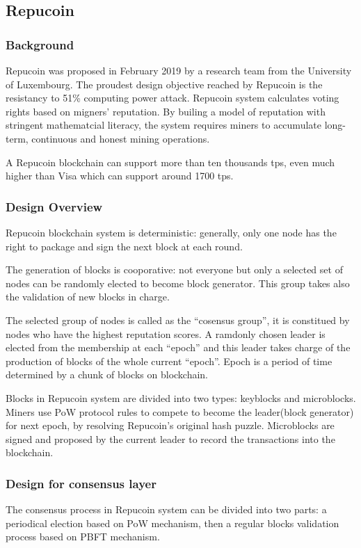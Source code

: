 \documentclass[doublespacing]{bmcart}
\begin{document}
\begin{CJK*}{UTF8}{gbsn}
	\subsection{Repucoin} 
	\subsubsection*{Background} 
	Repucoin was proposed in February 2019 by a research team from the University of Luxembourg. The proudest design objective reached by Repucoin is the resistancy to 51\% computing power attack. Repucoin system calculates voting rights based on migners' reputation. By builing a model of reputation with stringent mathematcial literacy, the system requires miners to accumulate long-term, continuous and honest mining operations.
	
	A Repucoin blockchain can support more than ten thousands tps, even much higher than Visa which can support around 1700 tps.
	\subsubsection*{Design Overview}
	Repucoin blockchain system is deterministic: generally, only one node has the right to package and sign the next block at each round. 
	
	The generation of blocks is cooporative: not everyone but only a selected set of nodes can be randomly elected to become block generator. This group takes also the validation of new blocks in charge.
	
	The selected group of nodes is called as the ``cosensus group'', it is constitued by nodes who have the highest reputation scores. A ramdonly chosen leader is elected from the membership at each ``epoch'' and this leader takes charge of the production of blocks of the whole current ``epoch''. Epoch is a period of time determined by a chunk of blocks on blockchain.
	
	Blocks in Repucoin system are divided into two types: keyblocks and microblocks. Miners use PoW protocol rules to compete to become the leader(block generator) for next epoch, by resolving Repucoin's original hash puzzle. Microblocks are signed and proposed by the current leader to record the transactions into the blockchain.
	\subsubsection*{Design for consensus layer}
	The consensus process in Repucoin system can be divided into two parts: a periodical election based on PoW mechanism, then a regular blocks validation process based on PBFT mechanism.
	

\end{CJK*}
\end{document}
